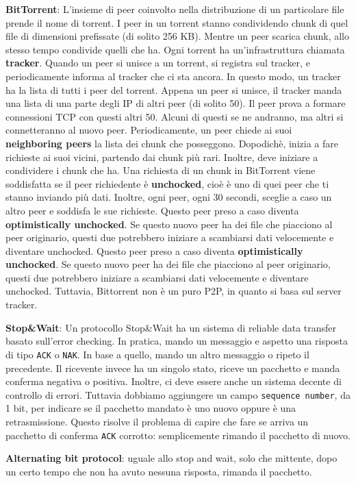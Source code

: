 \documentclass[a4paper,10pt]{article} %
\renewcommand{\b}[1]{%
    {\textbf{#1}}}
\renewcommand{\t}[1]{%
    {\texttt{#1}}}
\begin{document}
\b{BitTorrent}: L'insieme di peer coinvolto nella distribuzione di un particolare file prende il nome di torrent. I peer in un torrent stanno condividendo chunk di quel file di dimensioni prefissate (di solito 256 KB). Mentre un peer scarica chunk, allo stesso tempo condivide quelli che ha. Ogni torrent ha un'infrastruttura chiamata \b{tracker}. Quando un peer si unisce a un torrent, si registra sul tracker, e periodicamente informa al tracker che ci sta ancora. In questo modo, un tracker ha la lista di tutti i peer del torrent. Appena un peer si unisce, il tracker manda una lista di una parte degli IP di altri peer (di solito 50). Il peer prova a formare connessioni TCP con questi altri 50. Alcuni di questi se ne andranno, ma altri si connetteranno al nuovo peer. Periodicamente, un peer chiede ai suoi \b{neighboring peers} la lista dei chunk che posseggono. Dopodichè, inizia a fare richieste ai suoi vicini, partendo dai chunk più rari. Inoltre, deve iniziare a condividere i chunk che ha. Una richiesta di un chunk in BitTorrent viene soddisfatta se il peer richiedente è \b{unchocked}, cioè è uno di quei peer che ti stanno inviando più dati. Inoltre, ogni peer, ogni 30 secondi, sceglie a caso un altro peer e soddisfa le sue richieste. Questo peer preso a caso diventa \b{optimistically unchocked}. Se questo nuovo peer ha dei file che piacciono al peer originario, questi due potrebbero iniziare a scambiarsi dati velocemente e diventare unchocked. Questo peer preso a caso diventa \b{optimistically unchocked}. Se questo nuovo peer ha dei file che piacciono al peer originario, questi due potrebbero iniziare a scambiarsi dati velocemente e diventare unchocked. Tuttavia, Bittorrent non è un puro P2P, in quanto si basa sul server tracker.


\b{Stop\&Wait}: Un protocollo Stop\&Wait ha un sistema di reliable data transfer basato sull'error checking. In pratica, mando un messaggio e aspetto una risposta di tipo \t{ACK} o \t{NAK}. In base a quello, mando un altro messaggio o ripeto il precedente. Il ricevente invece ha un singolo stato, riceve un pacchetto e manda conferma negativa o positiva. Inoltre, ci deve essere anche un sistema decente di controllo di errori. Tuttavia dobbiamo aggiungere un campo \t{sequence number}, da 1 bit, per indicare se il pacchetto mandato è uno nuovo oppure è una retrasmissione. Questo risolve il problema di capire che fare se arriva un pacchetto di conferma \t{ACK} corrotto: semplicemente rimando il pacchetto di nuovo.

\b{Alternating bit protocol}: uguale allo stop and wait, solo che mittente, dopo un certo tempo che non ha avuto nessuna risposta, rimanda il pacchetto. 
\end{document}
